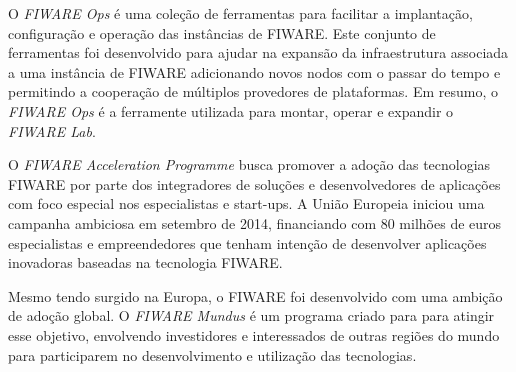 O \textit{FIWARE Ops} é uma coleção de ferramentas para facilitar a implantação, configuração e operação das instâncias de FIWARE.
Este conjunto de ferramentas foi desenvolvido para ajudar na expansão da infraestrutura associada a uma instância de FIWARE
adicionando novos nodos com o passar do tempo e permitindo a cooperação de múltiplos provedores de plataformas. Em resumo,
o \textit{FIWARE Ops} é a ferramente utilizada para montar, operar e expandir o \textit{FIWARE Lab}.

O \textit{FIWARE Acceleration Programme} busca promover a adoção das tecnologias FIWARE por parte dos integradores de
soluções e desenvolvedores de aplicações com foco especial nos especialistas e start-ups. A União Europeia iniciou uma
campanha ambiciosa em setembro de 2014, financiando com 80 milhões de euros especialistas e empreendedores que tenham
intenção de desenvolver aplicações inovadoras baseadas na tecnologia FIWARE.

Mesmo tendo surgido na Europa, o FIWARE foi desenvolvido com uma ambição de adoção global. O \textit{FIWARE Mundus} é um programa
criado para para atingir esse objetivo, envolvendo investidores e interessados de outras regiões do mundo para participarem
no desenvolvimento e utilização das tecnologias.

